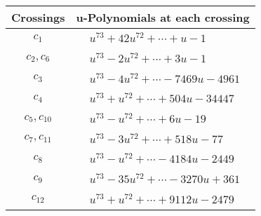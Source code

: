 \documentclass[1p]{elsarticle_modified}
\theoremstyle{definition}
\begin{document}
\begin{tabular}{m{50pt}|m{274pt}}
Crossings & \hspace{64pt}u-Polynomials at each crossing \\
\hline $$\begin{aligned}c_{1}\end{aligned}$$&$\begin{aligned}
&u^{73}+42 u^{72}+\cdots+u-1
\end{aligned}$\\
\hline $$\begin{aligned}c_{2},c_{6}\end{aligned}$$&$\begin{aligned}
&u^{73}-2 u^{72}+\cdots+3 u-1
\end{aligned}$\\
\hline $$\begin{aligned}c_{3}\end{aligned}$$&$\begin{aligned}
&u^{73}-4 u^{72}+\cdots-7469 u-4961
\end{aligned}$\\
\hline $$\begin{aligned}c_{4}\end{aligned}$$&$\begin{aligned}
&u^{73}+u^{72}+\cdots+504 u-34447
\end{aligned}$\\
\hline $$\begin{aligned}c_{5},c_{10}\end{aligned}$$&$\begin{aligned}
&u^{73}- u^{72}+\cdots+6 u-19
\end{aligned}$\\
\hline $$\begin{aligned}c_{7},c_{11}\end{aligned}$$&$\begin{aligned}
&u^{73}-3 u^{72}+\cdots+518 u-77
\end{aligned}$\\
\hline $$\begin{aligned}c_{8}\end{aligned}$$&$\begin{aligned}
&u^{73}- u^{72}+\cdots-4184 u-2449
\end{aligned}$\\
\hline $$\begin{aligned}c_{9}\end{aligned}$$&$\begin{aligned}
&u^{73}-35 u^{72}+\cdots-3270 u+361
\end{aligned}$\\
\hline $$\begin{aligned}c_{12}\end{aligned}$$&$\begin{aligned}
&u^{73}+u^{72}+\cdots+9112 u-2479
\end{aligned}$\\
\hline
\end{tabular}\\~\\
\end{document}
